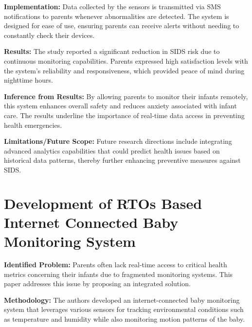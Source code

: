 \documentclass[12pt,a4paper]{report}
\begin{document}
\noindent\textbf{Implementation:} Data collected by the sensors is transmitted via SMS notifications to parents whenever abnormalities are detected. The system is designed for ease of use, ensuring parents can receive alerts without needing to constantly check their devices.
\setlength{\parskip}{1em}  %

\noindent\textbf{Results:} The study reported a significant reduction in SIDS risk due to continuous monitoring capabilities. Parents expressed high satisfaction levels with the system's reliability and responsiveness, which provided peace of mind during nighttime hours.

\setlength{\parskip}{1em}  %


\noindent\textbf{Inference from Results:} By allowing parents to monitor their infants remotely, this system enhances overall safety and reduces anxiety associated with infant care. The results underline the importance of real-time data access in preventing health emergencies.


\setlength{\parskip}{1em}  %

\noindent\textbf{Limitations/Future Scope:} Future research directions include integrating advanced analytics capabilities that could predict health issues based on historical data patterns, thereby further enhancing preventive measures against SIDS.
\setlength{\parskip}{1em}  %


\section{Development of RTOs Based Internet Connected Baby Monitoring System}
\textbf{Identified Problem:} Parents often lack real-time access to critical health metrics concerning their infants due to fragmented monitoring systems. This paper addresses this issue by proposing an integrated solution\cite{mishra2018development}.

\setlength{\parskip}{1em}  %


\noindent\textbf{Methodology:} The authors developed an internet-connected baby monitoring system that leverages various sensors for tracking environmental conditions such as temperature and humidity while also monitoring motion patterns of the baby.

\setlength{\parskip}{1em}  %
\end{document}
